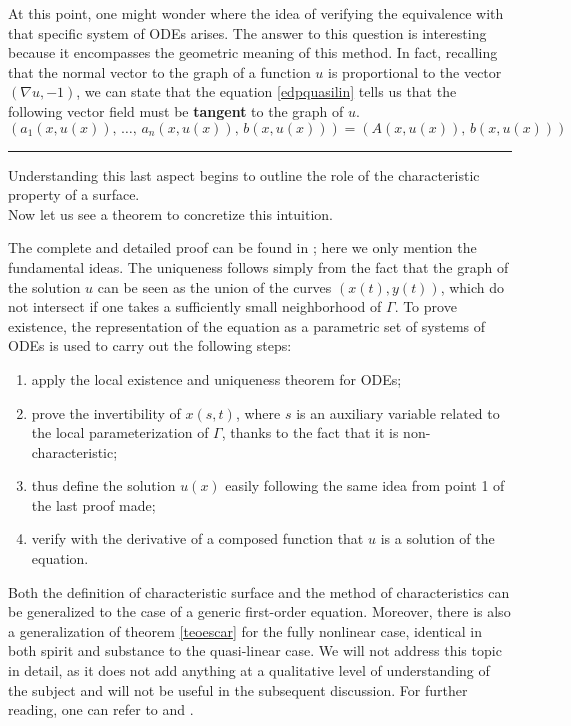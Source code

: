 At this point, one might wonder where the idea of verifying the equivalence with that specific system of ODEs arises. The answer to this question is interesting because it encompasses the geometric meaning of this method. In fact, recalling that the normal vector to the graph of a function $u$ is proportional to the vector $(\nabla u , -1)$, we can state that the equation \eqref{edpquasilin} tells us that the following vector field must be \textbf{tangent} to the graph of $u$.
$$(a_1(x,u(x)),\, \ldots ,\, a_n(x,u(x)),\, b(x,u(x)))=(A(x,u(x)),\, b(x,u(x)))$$

\noindent\rule[0.5ex]{\linewidth}{0.2pt}

Understanding this last aspect begins to outline the role of the characteristic property of a surface. \\
Now let us see a theorem to concretize this intuition.
\begin{theorem}\label{teoescar}
\end{theorem}
The complete and detailed proof can be found in \cite[cap.1]{Folland}; here we only mention the fundamental ideas. The uniqueness follows simply from the fact that the graph of the solution $u$ can be seen as the union of the curves $(x(t),y(t))$, which do not intersect if one takes a sufficiently small neighborhood of $\Gamma$. To prove existence, the representation of the equation as a parametric set of systems of ODEs is used to carry out the following steps:
\begin{enumerate}
\item apply the local existence and uniqueness theorem for ODEs;
\item prove the invertibility of $x(s,t)$, where $s$ is an auxiliary variable related to the local parameterization of $\Gamma$, thanks to the fact that it is non-characteristic;
\item thus define the solution $u(x)$ easily following the same idea from point 1 of the last proof made;
\item verify with the derivative of a composed function that $u$ is a solution of the equation.
\end{enumerate}
Both the definition of characteristic surface and the method of characteristics can be generalized to the case of a generic first-order equation. Moreover, there is also a generalization of theorem \ref{teoescar} for the fully nonlinear case, identical in both spirit and substance to the quasi-linear case.
We will not address this topic in detail, as it does not add anything at a qualitative level of understanding of the subject and will not be useful in the subsequent discussion. For further reading, one can refer to \cite[cap.1]{Folland} and \cite[cap.3]{Evans}.

